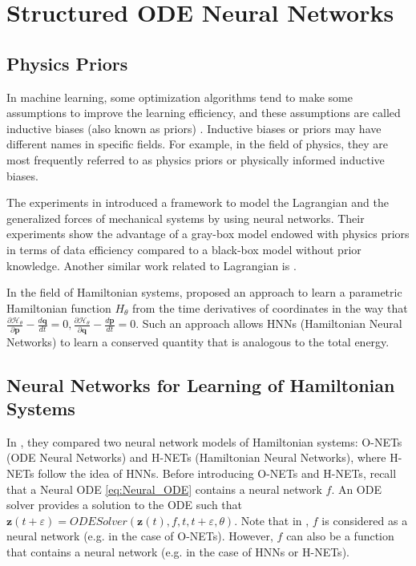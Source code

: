 \documentclass[
	parskip, 			   %
	twoside, 			   %
	DIV=14, 			   %
	BCOR=15.0mm, 		   %
	headsepline, 		   %
	open=right, 		   %
	captions=tableheading, %
	bibliography=totoc,    %
	numbers=noenddot       %
]{scrreprt}
\begin{document}
\clearpage
\chapter{Structured ODE Neural Networks}
\label{ch:chapter6}
\section{Physics Priors}
In machine learning, some optimization algorithms tend to make some assumptions to improve the learning efficiency, and these assumptions are called inductive biases (also known as priors) \cite{mitchell1997machine}. Inductive biases or priors may have different names in specific fields. For example, in the field of physics, they are most frequently referred to as physics priors or physically informed inductive biases.

The experiments in \cite{gupta2019general} introduced a framework to model the Lagrangian and the generalized forces of mechanical systems by using neural networks. Their experiments show the advantage of a gray-box model endowed with physics priors in terms of data efficiency compared to a black-box model without prior knowledge. Another similar work related to Lagrangian is \cite{lutter2019deep}.

In the field of Hamiltonian systems, \cite{greydanus2019hamiltonian} proposed an approach to learn a parametric Hamiltonian function $H_{\theta}$ from the time derivatives of coordinates in the way that $\frac{\partial \mathcal{H}_{\theta}}{\partial \mathbf{p}} - \frac{d\mathbf{q}}{dt} = 0, \frac{\partial \mathcal{H}_{\theta}}{\partial \mathbf{q}} - \frac{d\mathbf{p}}{dt} = 0 $. Such an approach allows HNNs (Hamiltonian Neural Networks) to learn a conserved quantity that is analogous to the total energy.

\section{Neural Networks for Learning of Hamiltonian Systems}
In \cite{chen2019symplectic}, they compared two neural network models of Hamiltonian systems: O-NETs (ODE Neural Networks) and H-NETs (Hamiltonian Neural Networks), where H-NETs follow the idea of HNNs. 
Before introducing O-NETs and H-NETs, recall that a Neural ODE \ref{eq:Neural_ODE} contains a neural network $f$. An ODE solver provides a solution to the ODE such that $\mathbf{z}(t+\varepsilon) = ODESolver(\mathbf{z}(t), f, t, t+\varepsilon , \theta)$. Note that in \cite{chen2019symplectic}, $f$ is considered as a neural network (e.g. in the case of O-NETs). However, $f$ can also be a function that contains a neural network (e.g. in the case of HNNs or H-NETs). 
\end{document}
